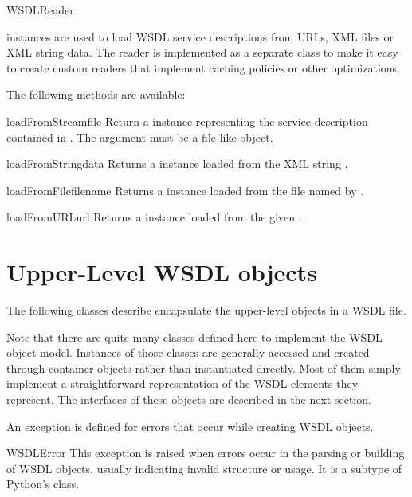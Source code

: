 \begin{classdesc}{WSDLReader}{}

 instances are used to load WSDL service descriptions
from URLs, XML files or XML string data. The reader is implemented as a 
separate class to make it easy to create custom readers that implement 
caching policies or other optimizations.

The following methods are available:

\begin{methoddesc}{loadFromStream}{file}
Return a  instance representing the service description 
contained in . The  argument must be a file-like 
object.
\end{methoddesc}

\begin{methoddesc}{loadFromString}{data}
Returns a  instance loaded from the XML string .
\end{methoddesc}

\begin{methoddesc}{loadFromFile}{filename}
Returns a  instance loaded from the file named by .
\end{methoddesc}

\begin{methoddesc}{loadFromURL}{url}
Returns a  instance loaded from the given .
\end{methoddesc}

\end{classdesc}

\section{Upper-Level WSDL objects}

The following classes describe encapsulate the upper-level objects
in a WSDL file.

Note that there are quite many classes defined here to
implement the WSDL object model. Instances of those classes are generally 
accessed and created through container objects rather than instantiated 
directly. Most of them simply implement a straightforward representation of 
the WSDL elements they represent. The interfaces of these objects are 
described in the next section.

An exception is defined for errors that occur while creating WSDL objects.

\begin{excdesc}{WSDLError}
This exception is raised when errors occur in the parsing or building of 
WSDL objects, usually indicating invalid structure or usage.
It is a subtype of Python's  class.
\end{excdesc}

